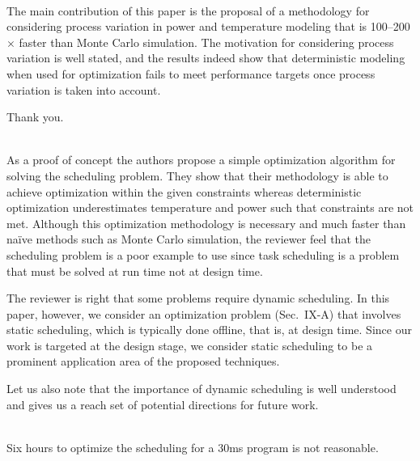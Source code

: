 \begin{reviewer}
\\
The main contribution of this paper is the proposal of a methodology for
considering process variation in power and temperature modeling that is
100--200$\times$ faster than Monte Carlo simulation. The motivation for
considering process variation is well stated, and the results indeed show that
deterministic modeling when used for optimization fails to meet performance
targets once process variation is taken into account.
\end{reviewer}

\begin{authors}
Thank you.
\end{authors}

\begin{reviewer}
\\
As a proof of concept the authors propose a simple optimization algorithm for
solving the scheduling problem. They show that their methodology is able to
achieve optimization within the given constraints whereas deterministic
optimization underestimates temperature and power such that constraints are not
met. Although this optimization methodology is necessary and much faster than
na\"{i}ve methods such as Monte Carlo simulation, the reviewer feel that the
scheduling problem is a poor example to use since task scheduling is a problem
that must be solved at run time not at design time.
\end{reviewer}

\begin{authors}
The reviewer is right that some problems require dynamic scheduling. In this
paper, however, we consider an optimization problem (Sec.~IX-A) that involves
static scheduling, which is typically done offline, that is, at design time.
Since our work is targeted at the design stage, we consider static scheduling
to be a prominent application area of the proposed techniques.

Let us also note that the importance of dynamic scheduling is well understood
and gives us a reach set of potential directions for future work.

\begin{actions}
\end{actions}
\end{authors}

\begin{reviewer}
\\
Six hours to optimize the scheduling for a 30ms program is not reasonable.
\end{reviewer}

